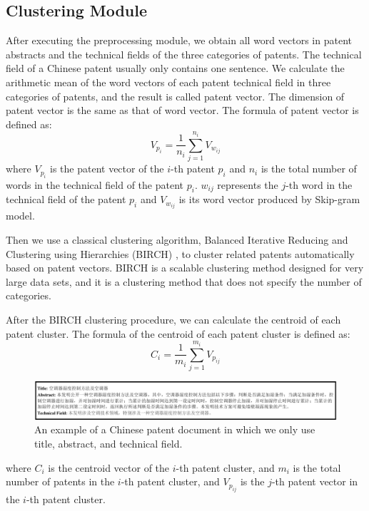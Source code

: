 \documentclass[conference]{IEEEtran}
\begin{document}
	\subsection{Clustering Module}
	After executing the preprocessing module, we obtain all word vectors in patent abstracts and the technical fields of the three categories of patents. The technical field of a Chinese patent usually only contains one sentence. We calculate the arithmetic mean of the word vectors of each patent technical field in three categories of patents, and the result is called patent vector. The dimension of patent vector is the same as that of word vector. The formula of patent vector is defined as:
	\begin{equation}
	V_{p_i}=\frac{1}{n_i}\sum_{j = 1} ^{n_i} V_{w_{ij}}\label{eq1}
	\end{equation}
	where $V_{p_i}$ is the patent vector of the $i$-th patent $p_i$ and $n_i$ is the total number of words in the technical field of the patent $p_i$. $w_{ij}$ represents the $j$-th word in the technical field of the patent $p_i$ and $V_{w_{ij}}$ is its word vector produced by Skip-gram model.
	
	Then we use a classical clustering algorithm, Balanced Iterative Reducing and Clustering using Hierarchies (BIRCH) \cite{b25}, to cluster related patents automatically based on patent vectors. BIRCH is a scalable clustering method designed for very large data sets, and it is a clustering method that does not specify the number of categories.
	
	After the BIRCH clustering procedure, we can calculate the centroid of each patent cluster. The formula of the centroid of each patent cluster is defined as:
	\begin{equation}
	C_i=\frac{1}{m_i}\sum_{j = 1} ^{m_i} V_{p_{ij}}\label{eq2}
	\end{equation}
	
	\begin{figure}[hb]
		\centering
		\includegraphics[scale=0.7]{sample.png} 
		\caption{An example of a Chinese patent document in which we only use title, abstract, and technical field.}
		\label{sample}
	\end{figure}

	where $C_i$ is the centroid vector of the $i$-th patent cluster, and $m_i$ is the total number of patents in the $i$-th patent cluster, and $V_{p_{ij}}$ is the $j$-th patent vector in the $i$-th patent cluster.
\end{document}
